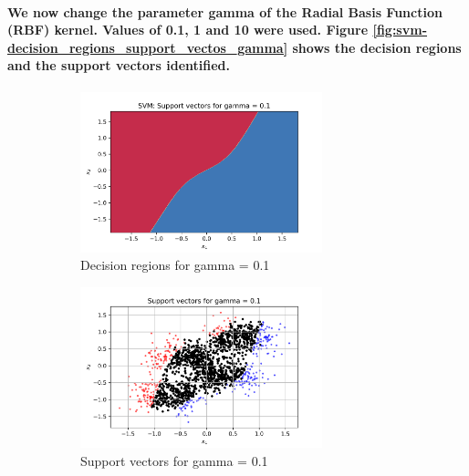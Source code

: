 \documentclass[a4paper]{article}    %
\begin{document}
\paragraph{We now change the parameter gamma of the Radial Basis Function (RBF) kernel. Values of 0.1, 1 and 10 were used. Figure \ref{fig:svm-decision_regions_support_vectos_gamma} shows the decision regions and the support vectors identified.}


\begin{figure}[H]
    \centering
    \begin{subfigure}{0.45\textwidth}
        \centering
        \includegraphics[width=7cm]{decision_region_gamma_0d1}
        \caption{Decision regions for gamma = 0.1}
        \label{fig:svm-decision_region_gamma_0d1}
    \end{subfigure}
    \hfill
    \begin{subfigure}{0.45\textwidth}
        \centering
        \includegraphics[width=7cm]{support_vectors_gamma_0d1}
        \caption{Support vectors for gamma = 0.1}
        \label{fig:svm-support_vectors_gamma_0d1}
    \end{subfigure}
    \begin{subfigure}{0.45\textwidth}

\end{subfigure}
\end{figure}
\end{document}
